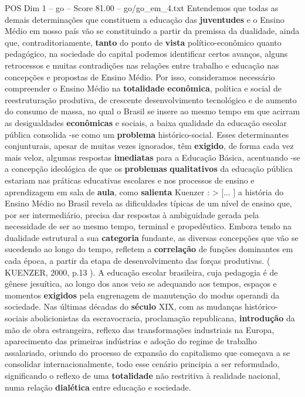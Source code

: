 \begin{textsample}{POS Dim 1 – go – Score 81.00 – go/go\_em\_4.txt}
Entendemos que todas as demais determinações que constituem a educação das \textbf{juventudes} e o Ensino Médio em nosso país vão se constituindo a partir da premissa da dualidade, ainda que, contraditoriamente, \textbf{tanto} do ponto de \textbf{vista} político-econômico quanto pedagógico, na sociedade do capital podemos identificar certos avanços, alguns retrocessos e muitas contradições nas relações entre trabalho e educação nas concepções e propostas de Ensino Médio.
Por isso, consideramos necessário compreender o Ensino Médio na \textbf{totalidade} \textbf{econômica}, política e social de reestruturação produtiva, de crescente desenvolvimento tecnológico e de aumento do consumo de massa, no qual o Brasil se insere ao mesmo tempo em que acirram as desigualdades \textbf{econômicas} e sociais, a baixa qualidade da educação escolar pública consolida -se como um \textbf{problema} histórico-social.
Esses determinantes conjunturais, apesar de muitas vezes ignorados, têm \textbf{exigido}, de forma cada vez mais veloz, algumas respostas \textbf{imediatas} para a Educação Básica, acentuando -se a concepção ideológica de que os \textbf{problemas} \textbf{qualitativos} da educação pública estariam nas práticas educativas escolares e nos processos de ensino e aprendizagem em sala de \textbf{aula}, como \textbf{salienta} Kuenzer : > [... ] a história do Ensino Médio no Brasil revela as dificuldades típicas de um nível de ensino que, por ser intermediário, precisa dar respostas à ambiguidade gerada pela necessidade de ser ao mesmo tempo, terminal e propedêutico.
Embora tendo na dualidade estrutural a sua \textbf{categoria} fundante, as diversas concepções que vão se sucedendo ao longo do tempo, refletem a \textbf{correlação} de funções dominantes em cada época, a partir da etapa de desenvolvimento das forças produtivas. ( KUENZER, 2000, p.13 ).
A educação escolar brasileira, cuja pedagogia é de gênese jesuítica, ao longo dos anos veio se adequando aos tempos, espaços e momentos \textbf{exigidos} pela engrenagem de manutenção do modus operandi da sociedade.
Nas últimas décadas do \textbf{século} XIX, com as mudanças histórico-sociais abolicionistas da escravocracia, proclamação republicana, \textbf{introdução} da mão de obra estrangeira, reflexo das transformações industriais na Europa, aparecimento das primeiras indústrias e adoção do regime de trabalho assalariado, oriundo do processo de expansão do capitalismo que começava a se consolidar internacionalmente, todo esse cenário principia a ser reformulado, significando o reflexo de uma \textbf{totalidade} não restritiva à realidade nacional, numa relação \textbf{dialética} entre educação e sociedade.

\end{textsample}
